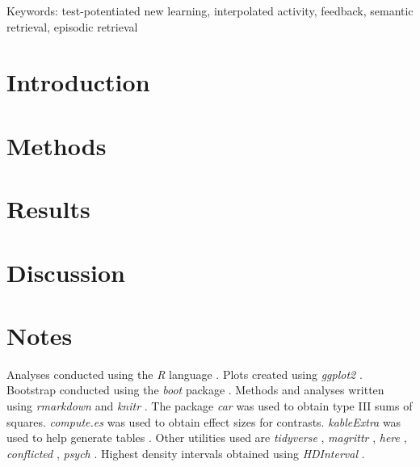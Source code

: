 \documentclass[12pt]{article}
\begin{document}
\bigskip

\noindent Keywords: test-potentiated new learning, interpolated activity, feedback,
semantic retrieval, episodic retrieval

\clearpage

\hypertarget{introduction}{%
\section{Introduction}}



\hypertarget{methods}{%
\section{Methods}}



\hypertarget{results}{%
\section{Results}}



\hypertarget{discussion}{%
\section{Discussion}}



\section{Notes}

Analyses conducted using the \textit{R} language
\citep{rcoreteamLanguageEnvironmentStatistical2019}. Plots created using
\textit{ggplot2} \citep{wickhamGgplot2ElegantGraphics2016}. Bootstrap
conducted using the \textit{boot} package
\citep{cantyBootBootstrapSPlus2017}. Methods and analyses written using
\textit{rmarkdown} \citep{allaireRmarkdownDynamicDocuments2019} and
\textit{knitr} \citep{xieKnitrGeneralPurposePackage2019}. The package
\textit{car} \citep{foxCompanionAppliedRegression2011} was used to
obtain type III sums of squares. \textit{compute.es}
\citep{reComputeEsCompute2013} was used to obtain effect sizes for
contrasts. \textit{kableExtra} was used to help generate tables
\citep{zhuKableExtraConstructComplex2019}. Other utilities used are
\textit{tidyverse} \citep{wickhamTidyverseEasilyInstall2017},
\textit{magrittr} \citep{bacheMagrittrForwardPipeOperator2014},
\textit{here} \citep{mullerHereSimplerWay2017}, \textit{conflicted}
\citep{wickhamConflictedAlternativeConflict2018}, \textit{psych}
\citep{revellePsychProceduresPsychological2018}. Highest density
intervals obtained using \textit{HDInterval}
\citep{meredithHDIntervalHighestPosterior2018}.
\clearpage
\end{document}

